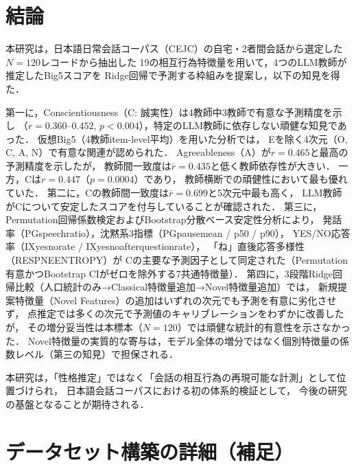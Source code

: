 \documentclass[dvipdfmx,11pt,a4paper]{bxjsarticle}
\renewcommand{\_}{\paperorigunderscore\allowbreak}%
\begin{document}
\section{結論}

本研究は，日本語日常会話コーパス（CEJC）の自宅・2者間会話から選定した$N = 120$レコードから抽出した
19の相互行為特徴量を用いて，4つのLLM教師が推定したBig5スコアを
Ridge回帰で予測する枠組みを提案し，以下の知見を得た．

第一に，Conscientiousness（C: 誠実性）は4教師中3教師で有意な予測精度を示し
（$r = 0.360$--$0.452$, $p < 0.004$），特定のLLM教師に依存しない頑健な知見であった．
仮想Big5（4教師item-level平均）を用いた分析では，
Eを除く4次元（O, C, A, N）で有意な関連が認められた．
Agreeableness（A）が$r = 0.465$と最高の予測精度を示したが，
教師間一致度は$\bar{r} = 0.435$と低く教師依存性が大きい．
一方，Cは$r = 0.447$（$p = 0.0004$）であり，
教師横断での頑健性において最も優れていた．
第二に，Cの教師間一致度は$\bar{r} = 0.699$と5次元中最も高く，
LLM教師がCについて安定したスコアを付与していることが確認された．
第三に，Permutation回帰係数検定およびBootstrap分散ベース安定性分析により，
発話率（PG\_speech\_ratio），沈黙系3指標（PG\_pause\_mean / p50 / p90），
YES/NO応答率（IX\_yesno\_rate / IX\_yesno\_after\_question\_rate），
「ね」直後応答多様性（RESP\_NE\_ENTROPY）が
Cの主要な予測因子として同定された（Permutation有意かつBootstrap CIがゼロを除外する7共通特徴量）．
第四に，3段階Ridge回帰比較（人口統計のみ→Classical特徴量追加→Novel特徴量追加）では，
新規提案特徴量（Novel Features）の追加はいずれの次元でも予測を有意に劣化させず，
点推定では多くの次元で予測値のキャリブレーションをわずかに改善したが，
その増分妥当性は本標本（$N = 120$）では頑健な統計的有意性を示さなかった．
Novel特徴量の実質的な寄与は，モデル全体の増分ではなく個別特徴量の係数レベル（第三の知見）で担保される．

本研究は，「性格推定」ではなく「会話の相互行為の再現可能な計測」として位置づけられ，
日本語会話コーパスにおける初の体系的検証として，
今後の研究の基盤となることが期待される．

\appendix

\section{データセット構築の詳細（補足）}
\label{sec:supp_dataset}
\end{document}

